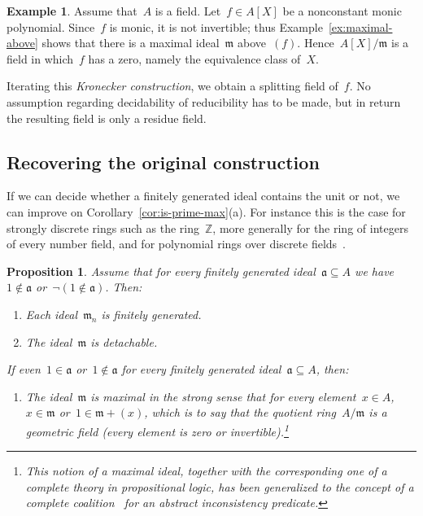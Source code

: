 \documentclass[com,11pt,crcready]{iosart2x}
\theoremstyle{definition}
\newtheorem{example}[definition]{Example}
\theoremstyle{plain}
\newtheorem{proposition}[definition]{Proposition}
\theoremstyle{remark}
\newcommand{\aaa}{\mathfrak{a}}
\newcommand{\mmm}{\mathfrak{m}}
\newcommand{\ZZ}{\mathbb{Z}}
\renewcommand{\_}{\mathpunct{.}\,}
\begin{document}
\begin{example}Assume that~$A$ is a field. Let~$f \in A[X]$ be a nonconstant monic
polynomial. Since~$f$ is monic, it is not invertible; thus
Example~\ref{ex:maximal-above} shows that there is a maximal ideal~$\mmm$
above~$(f)$. Hence~$A[X]/\mmm$ is a field in which~$f$ has a zero, namely the equivalence class of~$X$.

Iterating this \emph{Kronecker construction}, we obtain a splitting field of~$f$. No
assumption regarding decidability of reducibility has to be made, but in return
the resulting field is only a residue field.\end{example}


\subsection{Recovering the original construction}

If we can decide whether a finitely generated ideal contains the
unit or not, we can improve on Corollary~\ref{cor:is-prime-max}(a). For instance this is the case for
strongly discrete rings such as the ring~$\ZZ$, more generally for the ring of
integers of every number field, and for polynomial rings over discrete
fields~\cite[Theorem~VIII.1.5]{mines-richman-ruitenburg:constructive-algebra}.

\begin{proposition}\label{prop:with-test}
Assume that for every finitely generated ideal~$\aaa \subseteq A$ we have~$1
\not\in \aaa$ or~$\neg(1 \not\in \aaa)$. Then:
\begin{enumerate}
\item[\textnormal{(a)}] Each ideal~$\mmm_n$ is finitely generated.
\item[\textnormal{(b)}] The ideal~$\mmm$ is detachable.
\end{enumerate}
If even~$1 \in \aaa$ or~$1 \not\in \aaa$ for every finitely generated ideal~$\aaa \subseteq
A$, then:
\begin{enumerate}
\addtocounter{enumi}{2}
\item[\textnormal{(c)}] The ideal~$\mmm$ is maximal in the strong sense that for every element~$x
\in A$,~$x \in \mmm$ or~$1 \in \mmm + (x)$, which is to say that the quotient ring~$A/\mmm$ is a
\emph{geometric field} (every element is zero or invertible).\footnote{This
notion of a maximal ideal, together with the corresponding one of a complete
theory in propositional logic, has been generalized to the concept of a
complete coalition~\cite{schuster-wessel:cie2020,schuster-wessel:jacincpred} for an abstract inconsistency
predicate.}
\end{enumerate}
\end{proposition}
\end{document}
